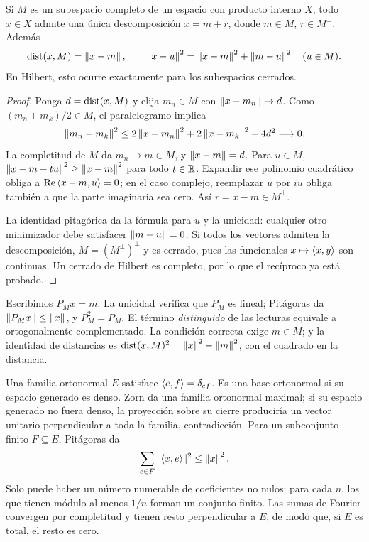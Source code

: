 \begin{teorema}\label{v3:proyeccion}
Si $M$ es un subespacio completo de un espacio con producto interno $X$, todo $x\in X$ admite una única descomposición $x=m+r$, donde $m\in M$, $r\in M^\perp$. Además
\[
 \operatorname{dist}(x,M)=\left\lVert x-m\right\rVert,\qquad
 \left\lVert x-u\right\rVert^2=\left\lVert x-m\right\rVert^2+\left\lVert m-u\right\rVert^2\quad(u\in M).
\]
En Hilbert, esto ocurre exactamente para los subespacios cerrados.
\end{teorema}
\begin{proof}
Ponga $d=\operatorname{dist}(x,M)$ y elija $m_n\in M$ con $\left\lVert x-m_n\right\rVert\to d$. Como $(m_n+m_k)/2\in M$, el paralelogramo implica
\[
 \left\lVert m_n-m_k\right\rVert^2\leq2\left\lVert x-m_n\right\rVert^2+2\left\lVert x-m_k\right\rVert^2-4d^2\longrightarrow0.
\]
La completitud de $M$ da $m_n\to m\in M$, y $\left\lVert x-m\right\rVert=d$. Para $u\in M$, $\left\lVert x-m-tu\right\rVert^2\geq\left\lVert x-m\right\rVert^2$ para todo $t\in\mathbb R$. Expandir ese polinomio cuadrático obliga a $\operatorname{Re}\left\langle x-m,u\right\rangle=0$; en el caso complejo, reemplazar $u$ por $iu$ obliga también a que la parte imaginaria sea cero. Así $r=x-m\in M^\perp$.

La identidad pitagórica da la fórmula para $u$ y la unicidad: cualquier otro minimizador debe satisfacer $\left\lVert m-u\right\rVert=0$. Si todos los vectores admiten la descomposición, $M=(M^\perp)^\perp$ y es cerrado, pues las funcionales $x\mapsto\left\langle x,y\right\rangle$ son continuas. Un cerrado de Hilbert es completo, por lo que el recíproco ya está probado.
\end{proof}
Escribimos $P_Mx=m$. La unicidad verifica que $P_M$ es lineal; Pitágoras da $\left\lVert P_Mx\right\rVert\leq\left\lVert x\right\rVert$, y $P_M^2=P_M$. El término \emph{distinguido} de las lecturas equivale a ortogonalmente complementado. La condición correcta exige $m\in M$; y la identidad de distancias es $\operatorname{dist}(x,M)^2=\left\lVert x\right\rVert^2-\left\lVert m\right\rVert^2$, con el cuadrado en la distancia.

Una familia ortonormal $E$ satisface $\left\langle e,f\right\rangle=\delta_{ef}$. Es una base ortonormal si su espacio generado es denso. Zorn da una familia ortonormal maximal; si su espacio generado no fuera denso, la proyección sobre su cierre produciría un vector unitario perpendicular a toda la familia, contradicción. Para un subconjunto finito $F\subseteq E$, Pitágoras da
\[
 \sum_{e\in F}|\left\langle x,e\right\rangle|^2\leq\left\lVert x\right\rVert^2.
\]
Solo puede haber un número numerable de coeficientes no nulos: para cada $n$, los que tienen módulo al menos $1/n$ forman un conjunto finito. Las sumas de Fourier convergen por completitud y tienen resto perpendicular a $E$, de modo que, si $E$ es total, el resto es cero.

